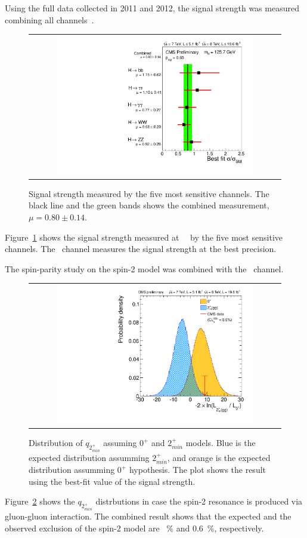 Using the full data collected in 2011 and 2012, the signal strength 
was measured combining all channels~\cite{CMS-PAS-HIG-13-005}. 
\begin{figure}[htp] \centering 
\begin{tabular}{c} 
\includegraphics[width=0.8\textwidth]{figures/sqr_mlz_ccc_mH125_7_decay.pdf} 
\end{tabular} 
\caption{Signal strength measured by the five most sensitive channels. 
The black line and the green bands shows the combined measurement, 
$\mu = 0.80 \pm 0.14$.} 
\label{fig:mucomb} 
\end{figure} 
Figure~\ref{fig:mucomb} shows the signal strength measured at ~\GeV\
by the five most sensitive channels. The \hww\ channel measures the signal strength
at the best precision. 

The spin-parity study on the spin-2 model was combined with the \hzz\ channel.  
\begin{figure}[htp] \centering 
\begin{tabular}{c} 
\includegraphics[width=0.8\textwidth]{figures/hvv_a-posteriori_qvals_root_2pmgg.pdf} 
\end{tabular} 
\caption{Distribution of $q_{2_{min}^+}$ assuming $0^+$ and $2_{min}^+$ models.  
Blue is the expected distribution assumming $2_{min}^+$, 
and orange is the expected distribution assumming $0^+$ hypothesis.
The plot shows the result using the best-fit value of the signal strength.}  
\label{fig:spincomb} 
\end{figure} 
Figure~\ref{fig:spincomb} shows the $q_{2_{min}^+}$ distrbutions in case the spin-2 resonance 
is produced via gluon-gluon interaction. The combined result shows that the 
expected and the observed exclusion of the spin-2 model are \CLs=1.2~\% and 0.6~\%, 
respectively. 
\\ 

